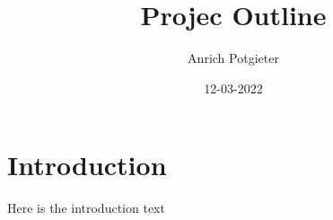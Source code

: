 \documentclass[12pt]{article}
\title{Projec Outline}
\author{Anrich Potgieter}
\date{12-03-2022}
\begin{document}
\maketitle
\section{Introduction}
Here is the introduction text
\end{document}
